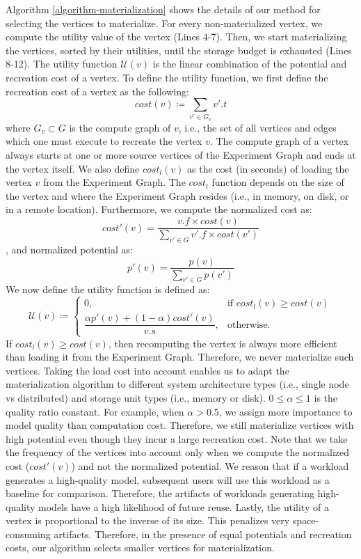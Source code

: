 Algorithm \ref{algorithm-materialization} shows the details of our method for selecting the vertices to materialize.
For every non-materialized vertex, we compute the utility value of the vertex (Lines 4-7).
Then, we start materializing the vertices, sorted by their utilities, until the storage budget is exhausted (Lines 8-12).
The utility function $\mathcal{U}(v) $ is the linear combination of the potential and recreation cost of a vertex.
To define the utility function, we first define the recreation cost of a vertex as the following:  
\[
cost(v) \coloneqq \sum\limits_{v' \in G_v} v'.t
\]
where $G_v \subset G$ is the compute graph of $v$, i.e., the set of all vertices and edges which one must execute to recreate the vertex $v$.
The compute graph of a vertex always starts at one or more source vertices of the Experiment Graph and ends at the vertex itself.
We also define $cost_l(v)$ as the cost (in seconds) of  loading the vertex $v$ from the Experiment Graph. 
The $cost_l$ function depends on the size of the vertex and where the Experiment Graph resides (i.e., in memory, on disk, or in a remote location).
Furthermore, we compute the normalized cost as:
\[cost'(v) = \dfrac{v.f  \times cost(v) }{\sum\limits_{v' \in G} v'.f \times cost(v')}\],
and normalized potential as:
\[p'(v) = \dfrac{p(v) }{\sum\limits_{v' \in G} p(v')}\]
We now define the utility function is defined as: 
\[
\mathcal{U}(v) \coloneqq  	
		\begin{cases}
		0, & \text{if }  cost_l(v) \ge cost(v)  \\ 
		\dfrac{\alpha p'(v) + (1-\alpha)cost'(v)}{v.s}, & \text{otherwise}.
		\end{cases}
\]
If $cost_l(v) \ge cost(v)$, then recomputing the vertex is always more efficient than loading it from the Experiment Graph.
Therefore, we never materialize such vertices.
Taking the load cost into account enables us to adapt the materialization algorithm to different system architecture types (i.e., single node vs distributed) and storage unit types (i.e., memory or disk).
$0 \leq \alpha \leq 1$ is the quality ratio constant.
For example, when $\alpha > 0.5$, we assign more importance to model quality than computation cost.
Therefore, we still materialize vertices with high potential even though they incur a large recreation cost.
Note that we take the frequency of the vertices into account only when we compute the normalized cost ($cost'(v)$) and not the normalized potential.
We reason that if a workload generates a high-quality model, subsequent users will use this workload as a baseline for comparison.
Therefore, the artifacts of workloads generating high-quality models have a high likelihood of future reuse.
Lastly, the utility of a vertex is proportional to the inverse of its size.
This penalizes very space-consuming artifacts.
Therefore, in the presence of equal potentials and recreation costs, our algorithm selects smaller vertices for materialization.

